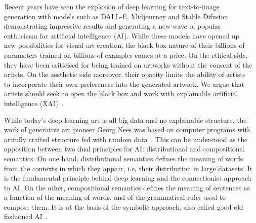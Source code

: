 Recent years have seen the explosion of deep learning for text-to-image generation with models such as DALL-E, Midjourney and Stable Difusion demonstrating impressive results and generating a new wave of popular enthusiasm for artificial intelligence (AI).
While these models have opened up new possibilities for visual art creation, the black box nature of their billions of parameters trained on billions of examples comes at a price.
On the ethical side, they have been criticised for being trained on artworks without the consent of the artists.
On the aesthetic side moreover, their opacity limits the ability of artists to incorporate their own preferences into the generated artwork.
We argue that artists should seek to open the black box and work with explainable artificial intelligence (XAI)~\cite{AdadiBerrada18}.

While today's deep learning art is all big data and no explainable structure, the work of generative art pioneer Georg Nees was based on computer programs with artfully crafted structure fed with random data~\cite{BodenEdmonds09}.
This can be understood as the opposition between two dual principles for AI: distributional and compositional semantics.
On one hand, distributional semantics defines the meaning of words from the contexts in which they appear, i.e. their distribution in large datasets.
It is the fundamental principle behind deep learning and the connectionist approach to AI.
On the other, compositional semantics defines the meaning of sentences as a function of the meaning of words, and of the grammatical rules used to compose them.
It is at the basis of the symbolic approach, also called good old-fashioned AI~\cite{Haugeland89}.

